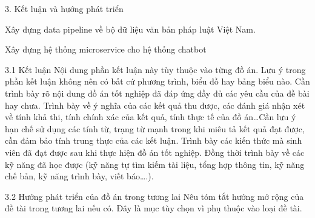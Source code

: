 3. Kết luận và hướng phát triển


Xây dựng data pipeline về bộ dữ liệu văn bản pháp luật Việt Nam.

Xây dựng hệ thống microservice cho hệ thống chatbot

3.1	Kết luận
Nội dung phần kết luận này tùy thuộc vào từng đồ án. Lưu ý trong phần kết luận không nên có bất cứ phương trình, biểu đồ hay bảng biểu nào. Cần trình bày rõ nội dung đồ án tốt nghiệp đã đáp ứng đầy đủ các yêu cầu của đề bài hay chưa. Trình bày về ý nghĩa của các kết quả thu được, các đánh giá nhận xét về tính khả thi, tính chính xác của kết quả, tính thực tế của đồ án…Cần lưu ý hạn chế sử dụng các tính từ, trạng từ mạnh trong khi miêu tả kết quả đạt được, cần đảm bảo tính trung thực của các kết luận.
Trình bày các kiến thức mà sinh viên đã đạt được sau khi thực hiện đồ án tốt nghiệp. Đồng thời trình bày về các kỹ năng đã học được (kỹ năng tự tìm kiếm tài liệu, tổng hợp thông tin, kỹ năng chế bản, kỹ năng trình bày, viết báo….).

3.2	Hướng phát triển của đồ án trong tương lai
Nêu tóm tắt hướng mở rộng của đề tài trong tương lai nếu có. Đây là mục tùy chọn vì phụ thuộc vào loại đề tài.

